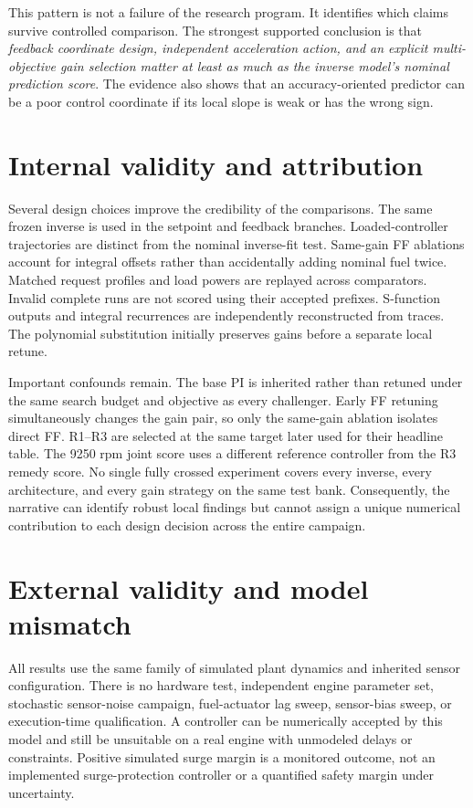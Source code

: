 \documentclass[11pt,a4paper,oneside]{report}
\begin{document}
This pattern is not a failure of the research program. It identifies which claims survive controlled comparison. The strongest supported conclusion is that \emph{feedback coordinate design, independent acceleration action, and an explicit multi-objective gain selection matter at least as much as the inverse model's nominal prediction score}. The evidence also shows that an accuracy-oriented predictor can be a poor control coordinate if its local slope is weak or has the wrong sign.

\section{Internal validity and attribution}
Several design choices improve the credibility of the comparisons. The same frozen inverse is used in the setpoint and feedback branches. Loaded-controller trajectories are distinct from the nominal inverse-fit test. Same-gain FF ablations account for integral offsets rather than accidentally adding nominal fuel twice. Matched request profiles and load powers are replayed across comparators. Invalid complete runs are not scored using their accepted prefixes. S-function outputs and integral recurrences are independently reconstructed from traces. The polynomial substitution initially preserves gains before a separate local retune.

Important confounds remain. The base PI is inherited rather than retuned under the same search budget and objective as every challenger. Early FF retuning simultaneously changes the gain pair, so only the same-gain ablation isolates direct FF. R1--R3 are selected at the same target later used for their headline table. The 9250 rpm joint score uses a different reference controller from the R3 remedy score. No single fully crossed experiment covers every inverse, every architecture, and every gain strategy on the same test bank. Consequently, the narrative can identify robust local findings but cannot assign a unique numerical contribution to each design decision across the entire campaign.

\section{External validity and model mismatch}
All results use the same family of simulated plant dynamics and inherited sensor configuration. There is no hardware test, independent engine parameter set, stochastic sensor-noise campaign, fuel-actuator lag sweep, sensor-bias sweep, or execution-time qualification. A controller can be numerically accepted by this model and still be unsuitable on a real engine with unmodeled delays or constraints. Positive simulated surge margin is a monitored outcome, not an implemented surge-protection controller or a quantified safety margin under uncertainty.
\end{document}
